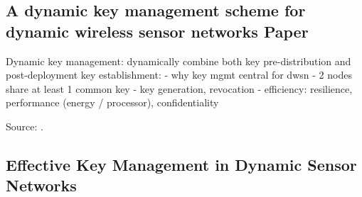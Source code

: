 \documentclass[12pt,a4paper,twoside]{report}
\begin{document}
\subsection{A dynamic key management scheme for dynamic wireless sensor networks Paper}

Dynamic key management: dynamically combine both key pre-distribution and post-deployment key establishment:
- why key mgmt central for dwsn
- 2 nodes share at least 1 common key
- key generation, revocation
- efficiency: resilience, performance (energy / processor), confidentiality

Source: \cite{erfani;etal:2015}.
\fi

\subsection{Effective Key Management in Dynamic Sensor Networks}
\end{document}
